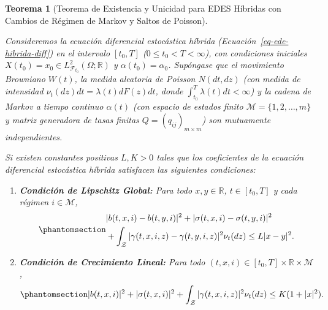 \documentclass[
  spanish,
  us-letterpaper,
]{scrreprt}
\numberwithin{equation}{section}
\theoremstyle{plain}
\newtheorem{theorem}{Teorema}[chapter]
\theoremstyle{plain}
\theoremstyle{definition}
\theoremstyle{plain}
\theoremstyle{remark}
\begin{document}
\begin{theorem}[Teorema de Existencia y Unicidad para EDES Híbridas con
Cambios de Régimen de Markov y Saltos de
Poisson]\protect\hypertarget{thm-mao-switching}{}\label{thm-mao-switching}

Consideremos la ecuación diferencial estocástica híbrida
(Ecuación~\ref{eq-ede-hibrida-diff}) en el intervalo \([t_0, T]\)
(\(0 \le t_0 < T < \infty\)), con condiciones iniciales
\(X(t_0) = x_0 \in L^2_{\mathcal{F}_{t_0}}(\Omega; \mathbb{R})\) y
\(\alpha(t_0) = \alpha_0\). Supóngase que el movimiento Browniano
\(W(t)\), la medida aleatoria de Poisson \(N(dt, dz)\) (con medida de
intensidad \(\nu_t(dz)dt = \lambda(t)dF(z)dt\), donde
\(\displaystyle \int_{t_0}^T \lambda(t)dt < \infty\)) y la cadena de
Markov a tiempo continuo \(\alpha(t)\) (con espacio de estados finito
\(\mathcal{M} = \{1, 2, \dots, m\}\) y matriz generadora de tasas
finitas \(Q = (q_{ij})_{m \times m}\)) son mutuamente independientes.

Si existen constantes positivas \(L, K > 0\) tales que los coeficientes
de la ecuación diferencial estocástica híbrida satisfacen las siguientes
condiciones:

\begin{enumerate}
\def\labelenumi{\arabic{enumi}.}
\item
  \textbf{Condición de Lipschitz Global:} Para todo
  \(x, y \in \mathbb{R}\), \(t \in [t_0, T]\) y cada régimen
  \(i \in \mathcal{M}\),
  \begin{equation}\phantomsection\label{eq-hip-lipschitz-hibrida}{
  \begin{aligned}
  &\vert b(t, x, i) - b(t, y, i) \vert^2 + \vert \sigma(t, x, i) - \sigma(t, y, i) \vert^2 \\
  &+ \int_{\mathcal{Z}} \vert \gamma(t, x, i, z) - \gamma(t, y, i, z) \vert^2 \nu_t(dz) \le L \vert x - y \vert^2.
  \end{aligned}
  }\end{equation}
\item
  \textbf{Condición de Crecimiento Lineal:} Para todo
  \((t, x, i) \in [t_0, T] \times \mathbb{R} \times \mathcal{M}\),
  \begin{equation}\phantomsection\label{eq-hip-crecimiento-hibrida}{
  \vert b(t, x, i) \vert^2 + \vert \sigma(t, x, i) \vert^2 + \int_{\mathcal{Z}} \vert \gamma(t, x, i, z) \vert^2 \nu_t(dz) \le K (1 + \vert x \vert^2).
  }\end{equation}
\end{enumerate}


\end{theorem}
\end{document}
